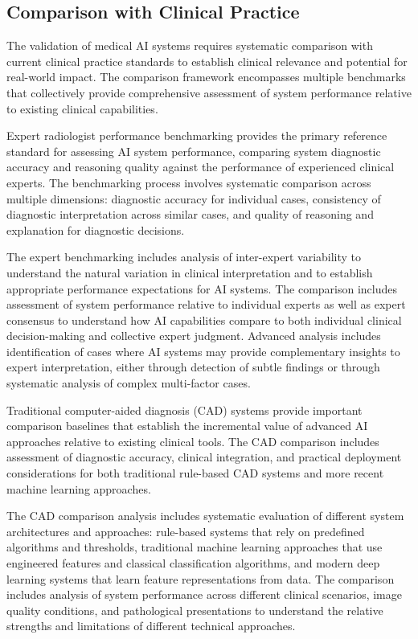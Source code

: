 \subsection{Comparison with Clinical Practice}

The validation of medical AI systems requires systematic comparison with current clinical practice standards to establish clinical relevance and potential for real-world impact. The comparison framework encompasses multiple benchmarks that collectively provide comprehensive assessment of system performance relative to existing clinical capabilities.

Expert radiologist performance benchmarking provides the primary reference standard for assessing AI system performance, comparing system diagnostic accuracy and reasoning quality against the performance of experienced clinical experts. The benchmarking process involves systematic comparison across multiple dimensions: diagnostic accuracy for individual cases, consistency of diagnostic interpretation across similar cases, and quality of reasoning and explanation for diagnostic decisions.

The expert benchmarking includes analysis of inter-expert variability to understand the natural variation in clinical interpretation and to establish appropriate performance expectations for AI systems. The comparison includes assessment of system performance relative to individual experts as well as expert consensus to understand how AI capabilities compare to both individual clinical decision-making and collective expert judgment. Advanced analysis includes identification of cases where AI systems may provide complementary insights to expert interpretation, either through detection of subtle findings or through systematic analysis of complex multi-factor cases.

Traditional computer-aided diagnosis (CAD) systems provide important comparison baselines that establish the incremental value of advanced AI approaches relative to existing clinical tools. The CAD comparison includes assessment of diagnostic accuracy, clinical integration, and practical deployment considerations for both traditional rule-based CAD systems and more recent machine learning approaches.

The CAD comparison analysis includes systematic evaluation of different system architectures and approaches: rule-based systems that rely on predefined algorithms and thresholds, traditional machine learning approaches that use engineered features and classical classification algorithms, and modern deep learning systems that learn feature representations from data. The comparison includes analysis of system performance across different clinical scenarios, image quality conditions, and pathological presentations to understand the relative strengths and limitations of different technical approaches.

